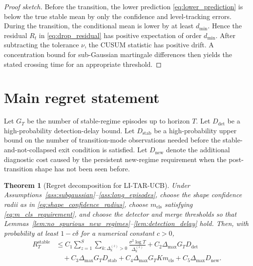 \documentclass[11pt]{article}
\newtheorem{theorem}{Theorem}
\begin{document}
\begin{proof}[Proof sketch]
Before the transition, the lower prediction \eqref{eq:lower_prediction} is below the true stable mean by only the confidence and level-tracking errors. During the transition, the conditional mean is lower by at least $d_{\min}$. Hence the residual $R_t$ in \eqref{eq:drop_residual} has positive expectation of order $d_{\min}$. After subtracting the tolerance $\nu$, the CUSUM statistic has positive drift. A concentration bound for sub-Gaussian martingale differences then yields the stated crossing time for an appropriate threshold.
\end{proof}

\section{Main regret statement}
\label{sec:main_regret}

Let $G_T$ be the number of stable-regime episodes up to horizon $T$. Let $D_{\mathrm{det}}$ be a high-probability detection-delay bound. Let $D_{\mathrm{stab}}$ be a high-probability upper bound on the number of transition-mode observations needed before the stable-and-not-collapsed exit condition is satisfied. Let $D_{\mathrm{new}}$ denote the additional diagnostic cost caused by the persistent new-regime requirement when the post-transition shape has not been seen before.

\begin{theorem}[Regret decomposition for LI-TAR-UCB]
\label{thm:main_regret}
Under Assumptions~\ref{ass:subgaussian}--\ref{ass:long_episodes}, choose the shape confidence radii as in \eqref{eq:shape_confidence_radius}, choose $m_{\mathrm{cls}}$ satisfying \eqref{eq:m_cls_requirement}, and choose the detector and merge thresholds so that Lemmas~\ref{lem:no_spurious_new_regimes}--\ref{lem:detection_delay} hold. Then, with probability at least $1-c\delta$ for a numerical constant $c>0$,
\begin{align}
\label{eq:main_regret_bound}
R_T^{\mathrm{stable}}
&\leq
C_1
\sum_{z=1}^{S}
\sum_{k:\Delta_k^{(z)}>0}
\frac{\sigma^2\log T}{\Delta_k^{(z)}}
+
C_2\Delta_{\max}G_TD_{\mathrm{det}}
\nonumber\\
&\quad+
C_3\Delta_{\max}G_TD_{\mathrm{stab}}
+
C_4\Delta_{\max}G_TK m_{\mathrm{cls}}
+
C_5\Delta_{\max}D_{\mathrm{new}}.
\end{align}
\end{theorem}
\end{document}
